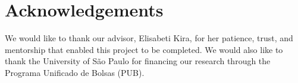 \documentclass[a4paper,10pt,twocolumn]{article}
\begin{document}
\section{Acknowledgements}

We would like to thank our advisor, Elisabeti Kira, for her patience, trust, and
mentorship that enabled this project to be completed. We would also like to thank
the University of São Paulo for financing our research through the Programa
Unificado de Bolsas (PUB).

\vspace{0.5cm}


\end{document}
